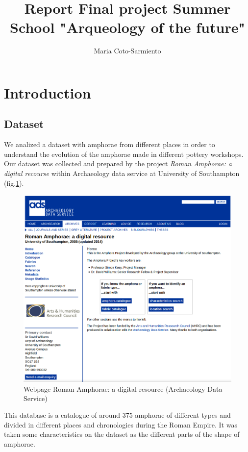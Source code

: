 \documentclass[10pt,a4paper]{article}
\author{Maria Coto-Sarmiento}
\title{Report Final project Summer School "Arqueology of the future"}
\begin{document}
\maketitle

\section{Introduction}

\subsection{Dataset}

We analized a dataset with amphorae from different places in order to understand the evolution of the amphorae made in different pottery workshops. Our dataset was collected and prepared by the project \emph{Roman Amphorae: a digital recourse} within Archaeology data service at University of Southampton (fig.\ref{picwebarch}).

\begin{figure}[htp]
	\centering
\includegraphics[scale=0.30]{picture1.png}
\caption{Webpage Roman Amphorae: a digital resource (Archaeology Data Service)}
\label{picwebarch}
\end{figure} 

This database is a catalogue of around 375 amphorae of different types and divided in different places and chronologies during the Roman Empire. It was taken some characteristics on the dataset as the different parts of the shape of amphorae. 
\end{document}

